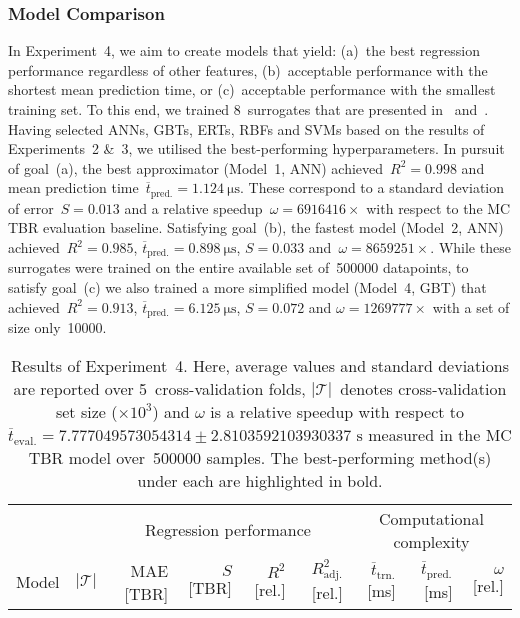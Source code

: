 \subsubsection{Model Comparison}
In Experiment~4, we aim to create models that yield:
(a)~the best regression performance regardless
of other features, (b)~acceptable performance with the shortest mean
prediction time, or (c)~acceptable performance with the smallest training set.
To this end, we trained 8~surrogates that are presented in~
and~.
Having selected ANNs, GBTs, ERTs, RBFs and SVMs based on the results of
Experiments~2 \&~3, we utilised the best-performing hyperparameters.
In pursuit of goal~(a), the best approximator (Model~1,
ANN) achieved~$R^2=\num{0.998}$ and mean prediction
time~$\overline{t}_{\text{pred.}}=\SI{1.124}{\micro\second}$. These correspond
to a standard deviation of error~$S=\num{0.013}$ and a relative speedup~$\omega=\num{6916416} \times$
with respect to the MC TBR evaluation baseline. Satisfying
goal~(b), the fastest model (Model~2, ANN) achieved~$R^2=\num{0.985}$,
$\overline{t}_{\text{pred.}}=\SI{0.898}{\micro\second}$, $S=\num{0.033}$
and~$\omega=\num{8659251} \times$.
While these surrogates
were trained on the entire available set of~\num{500000} datapoints, to satisfy
goal~(c) we also trained a more simplified model (Model~4, GBT)
that achieved~$R^2=\num{0.913}$,
$\overline{t}_{\text{pred.}}=\SI{6.125}{\micro\second}$, $S=\num{0.072}$ and $\omega=\num{1269777} \times$
with a set of size only~\num{10000}.

\begin{table*}
	\centering
	\caption{\label{tbl:exp4-detailed-results}Results of Experiment~4. Here,
		average values and standard deviations are reported over 5~cross-validation folds,
		$|\mathcal{T}|$~denotes cross-validation set size ($\times 10^3$)
		and $\omega$ is a relative speedup with respect to
		$\overline{t}_{\text{eval.}}=\num{7.777049573054314} \pm
		\num{2.8103592103930337} \text{ s}$
		measured in the MC TBR model over~\num{500000} samples.
	The best-performing method(s) under each are highlighted in bold.}
	\setlength\tabcolsep{4pt}
	\begin{indented}
	\item[]
		\scriptsize
		\begin{tabular}{lrrrrrrrr}
		\toprule
		{} & {} & \multicolumn{4}{c}{Regression performance} &
		\multicolumn{3}{c}{Computational complexity}\\
		\cmidrule(lr){3-6}
		\cmidrule(lr){7-9}
		Model & $|\mathcal{T}|$ & MAE [TBR] & $S$ [TBR] & $R^2$ [rel.] & $R^2_{\text{adj.}}$ [rel.]
						& $\overline{t}_{\text{trn.}}$ [\si{\milli\second}] &
		$\overline{t}_{\text{pred.}}$ [\si{\milli\second}] & $\omega$ [rel.]\\
		\midrule
		
		\bottomrule
		\end{tabular}
	\end{indented}
\end{table*}

